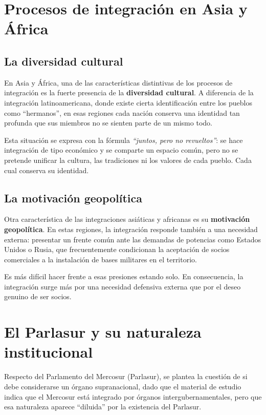 \documentclass[12pt,oneside]{book}
\begin{document}
\section{Procesos de integración en Asia y África}

\subsection{La diversidad cultural}

En Asia y África, una de las características distintivas de los procesos de integración es la fuerte presencia de la \textbf{diversidad cultural}. A diferencia de la integración latinoamericana, donde existe cierta identificación entre los pueblos como ``hermanos'', en esas regiones cada nación conserva una identidad tan profunda que sus miembros no se sienten parte de un mismo todo.

Esta situación se expresa con la fórmula \textit{``juntos, pero no revueltos''}: se hace integración de tipo económico y se comparte un espacio común, pero no se pretende unificar la cultura, las tradiciones ni los valores de cada pueblo. Cada cual conserva su identidad.

\subsection{La motivación geopolítica}

Otra característica de las integraciones asiáticas y africanas es su \textbf{motivación geopolítica}. En estas regiones, la integración responde también a una necesidad externa: presentar un frente común ante las demandas de potencias como Estados Unidos o Rusia, que frecuentemente condicionan la aceptación de socios comerciales a la instalación de bases militares en el territorio.

Es más difícil hacer frente a esas presiones estando solo. En consecuencia, la integración surge más por una necesidad defensiva externa que por el deseo genuino de ser socios.

\section{El Parlasur y su naturaleza institucional}

Respecto del Parlamento del Mercosur (Parlasur), se plantea la cuestión de si debe considerarse un órgano supranacional, dado que el material de estudio indica que el Mercosur está integrado por órganos intergubernamentales, pero que esa naturaleza aparece ``diluida'' por la existencia del Parlasur.
\end{document}
